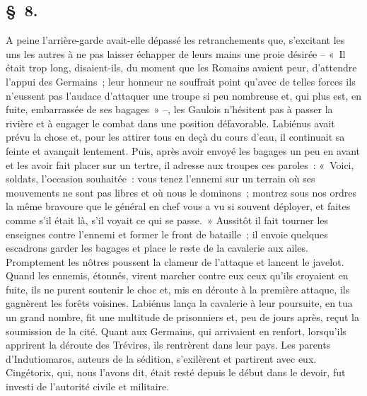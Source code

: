 \documentclass[french,twoside]{book} %
\begin{document}
\subsection[{§ 8.}]{ \textsc{§ 8.} }
\noindent A peine l’arrière-garde avait-elle dépassé les retranchements que, s’excitant les uns les autres à ne pas laisser échapper de leurs mains une proie désirée – « Il était trop long, disaient-ils, du moment que les Romains avaient peur, d’attendre l’appui des Germains ; leur honneur ne souffrait point qu’avec de telles forces ils n’eussent pas l’audace d’attaquer une troupe si peu nombreuse et, qui plus est, en fuite, embarrassée de ses bagages » –, les Gaulois n’hésitent pas à passer la rivière et à engager le combat dans une position défavorable. Labiénus avait prévu la chose et, pour les attirer tous en deçà du cours d’eau, il continuait sa feinte et avançait lentement. Puis, après avoir envoyé les bagages un peu en avant et les avoir fait placer sur un tertre, il adresse aux troupes ces paroles : « Voici, soldats, l’occasion souhaitée : vous tenez l’ennemi sur un terrain où ses mouvements ne sont pas libres et où nous le dominons ; montrez sous nos ordres la même bravoure que le général en chef vous a vu si souvent déployer, et faites comme s’il était là, s’il voyait ce qui se passe. » Aussitôt il fait tourner les enseignes contre l’ennemi et former le front de bataille ; il envoie quelques escadrons garder les bagages et place le reste de la cavalerie aux ailes. Promptement les nôtres poussent la clameur de l’attaque et lancent le javelot. Quand les ennemis, étonnés, virent marcher contre eux ceux qu’ils croyaient en fuite, ils ne purent soutenir le choc et, mis en déroute à la première attaque, ils gagnèrent les forêts voisines. Labiénus lança la cavalerie à leur poursuite, en tua un grand nombre, fit une multitude de prisonniers et, peu de jours après, reçut la soumission de la cité. Quant aux Germains, qui arrivaient en renfort, lorsqu’ils apprirent la déroute des Trévires, ils rentrèrent dans leur pays. Les parents d’Indutiomaros, auteurs de la sédition, s’exilèrent et partirent avec eux. Cingétorix, qui, nous l’avons dit, était resté depuis le début dans le devoir, fut investi de l’autorité civile et militaire.
\end{document}
